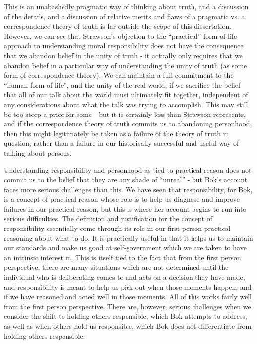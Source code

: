 \documentclass[phd,12pt,oneside,paper=letterpaper]{ubcthesis}
\begin{document}
This is an unabashedly pragmatic way of thinking about truth, and a discussion of the details, and a discussion of  relative merits and flaws of a pragmatic vs. a correspondence theory of truth is far outside the scope of this dissertation. However, we can see that Strawson's objection to the ``practical'' form of life approach to understanding moral responsibility does not have the consequence that we abandon belief in the unity of truth - it actually only requires that we abandon belief in a particular way of understanding the unity of truth (as some form of correspondence theory). We can maintain a full commitment to the ``human form of life'', and the unity of the real world, if we sacrifice the belief that all of our talk about the world must ultimately fit together, independent of any considerations about what the talk was trying to accomplish. This may still be too steep a price for some - but it is certainly less than Strawson represents, and if the correspondence theory of truth commits us to abandoning personhood, then this might legitimately be taken as a failure of the theory of truth in question, rather than a failure in our historically successful and useful way of talking about persons.

Understanding responsibility and personhood as tied to practical reason does not commit us to the belief that they are any shade of ``unreal'' - but Bok's account faces more serious challenges than this. We have seen that responsibility, for Bok, is a concept of practical reason whose role is to help us diagnose and improve failures in our practical reason, but this is where her account begins to run into serious difficulties. The definition and justification for the concept of responsibility essentially come through its role in our first-person practical reasoning about what to do. It is practically useful in that it helps us to maintain our standards and make us good at self-government which we are taken to have an intrinsic interest in.  This is itself tied to the fact that from the first person perspective, there are many situations which are not determined until the individual who is deliberating comes to and acts on a decision they have made, and responsibility is meant to help us pick out when those moments happen, and if we have reasoned and acted well in those moments. All of this works fairly well from the first person perspective. There are, however, serious challenges when we consider the shift to holding others responsible, which Bok attempts to address, as well as when others hold us responsible, which Bok does not differentiate from holding others responsible. 
\end{document}
